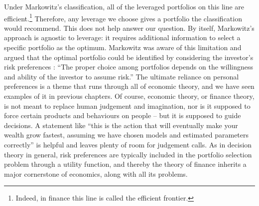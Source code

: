 Under Markowitz's classification, all of the leveraged portfolios on this line are efficient.\footnote{Indeed, in finance this line is called the efficient frontier.} Therefore, any leverage we choose gives a portfolio the classification would recommend. This does not help answer our question. By itself, Markowitz's approach is agnostic to leverage: it requires additional information to select a specific portfolio as the optimum. Markowitz was aware of this limitation and argued that the optimal portfolio could be identified by considering the investor's risk preferences \cite{Markowitz1991}: ``The proper choice among portfolios depends on the willingness and ability of the investor to assume risk.'' The ultimate reliance on personal preferences is a theme that runs through all of economic theory, and we have seen examples of it in previous chapters. Of course, economic theory, or finance theory, is not meant to replace human judgement and imagination, nor is it supposed to force certain products and behaviours on people -- but it is supposed to guide decisions. A statement like ``this is the action that will eventually make your wealth grow fastest, assuming we have chosen models and estimated parameters correctly'' is helpful and leaves plenty of room for judgement calls. As in decision theory in general, risk preferences are typically included in the portfolio selection problem through a utility function, and thereby the theory of finance inherits a major cornerstone of economics, along with all its problems.

